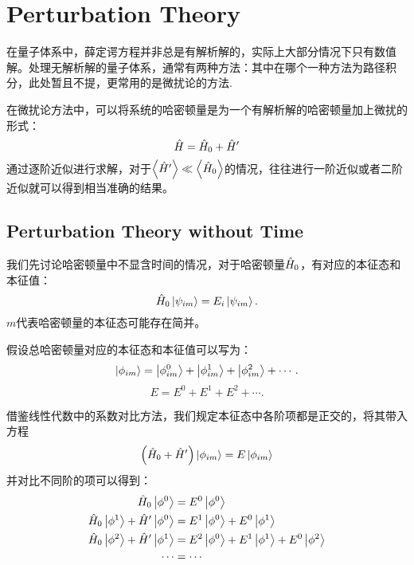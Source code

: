 \chapter{Perturbation Theory}
在量子体系中，薛定谔方程并非总是有解析解的，实际上大部分情况下只有数值解。处理无解析解的量子体系，通常有两种方法：其中在哪个一种方法为路径积分，此处暂且不提，更常用的是微扰论的方法.

在微扰论方法中，可以将系统的哈密顿量是为一个有解析解的哈密顿量加上微扰的形式：
\begin{equation}
    \hat{H}=\hat{H}_0+\hat{H}'
\end{equation}
通过逐阶近似进行求解，对于$\left<\hat{H}'\right>\ll\left<\hat{H}_0\right>$的情况，往往进行一阶近似或者二阶近似就可以得到相当准确的结果。

\section{Perturbation Theory without Time}
我们先讨论哈密顿量中不显含时间的情况，对于哈密顿量$\hat{H}_0$，有对应的本征态和本征值：
\begin{equation}
    \hat{H}_0\left|\psi_{im}\right>=E_i\left|\psi_{im}\right>.
\end{equation}
$m$代表哈密顿量的本征态可能存在简并。

假设总哈密顿量对应的本征态和本征值可以写为：
\begin{equation}
    \left|\phi_{im}\right>=\left|\phi_{im}^0\right>+\left|\phi_{im}^1\right>+\left|\phi_{im}^2\right>+\cdots.
\end{equation}
\begin{equation}
    E=E^0+E^1+E^2+\cdots.
\end{equation}

借鉴线性代数中的系数对比方法，我们规定本征态中各阶项都是正交的，将其带入方程
\begin{equation}
    \left(\hat{H}_0+\hat{H}'\right)\left|\phi_{im}\right>=E\left|\phi_{im}\right>
\end{equation}
并对比不同阶的项可以得到：
\begin{equation}
    \label{Pertur_orders}
    \begin{aligned}
        \hat{H}_0\left|\phi^0\right>&=E^0\left|\phi^0\right>\\
        \hat{H}_0\left|\phi^1\right>+\hat{H}'\left|\phi^0\right>&=E^1\left|\phi^0\right>+E^0\left|\phi^1\right>\\
        \hat{H}_0\left|\phi^2\right>+\hat{H}'\left|\phi^1\right>&=E^2\left|\phi^0\right>+E^1\left|\phi^1\right>+E^0\left|\phi^2\right>\\
        \cdots&=\cdots
    \end{aligned}
\end{equation}

